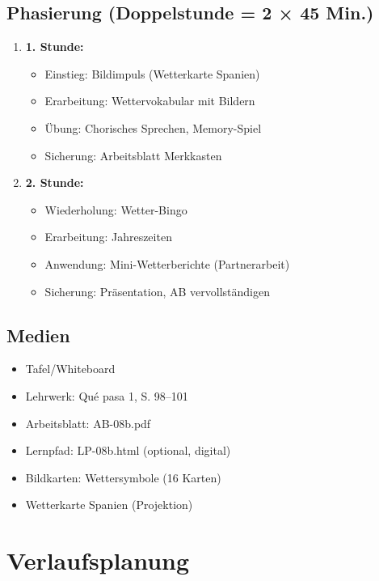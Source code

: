 \documentclass[11pt,a4paper]{article}
\newcommand{\lehrwerk}{Qué pasa 1}
\newcommand{\lehrwerkseite}{S. 98--101}
\begin{document}
\subsection{Phasierung (Doppelstunde = 2 × 45 Min.)}
\begin{enumerate}
    \item \textbf{1. Stunde:}
    \begin{itemize}
        \item Einstieg: Bildimpuls (Wetterkarte Spanien)
        \item Erarbeitung: Wettervokabular mit Bildern
        \item Übung: Chorisches Sprechen, Memory-Spiel
        \item Sicherung: Arbeitsblatt Merkkasten
    \end{itemize}
    \item \textbf{2. Stunde:}
    \begin{itemize}
        \item Wiederholung: Wetter-Bingo
        \item Erarbeitung: Jahreszeiten
        \item Anwendung: Mini-Wetterberichte (Partnerarbeit)
        \item Sicherung: Präsentation, AB vervollständigen
    \end{itemize}
\end{enumerate}

\subsection{Medien}
\begin{itemize}
    \item Tafel/Whiteboard
    \item Lehrwerk: \lehrwerk, \lehrwerkseite
    \item Arbeitsblatt: AB-08b.pdf
    \item Lernpfad: LP-08b.html (optional, digital)
    \item Bildkarten: Wettersymbole (16 Karten)
    \item Wetterkarte Spanien (Projektion)
\end{itemize}

\section{Verlaufsplanung}
\end{document}
